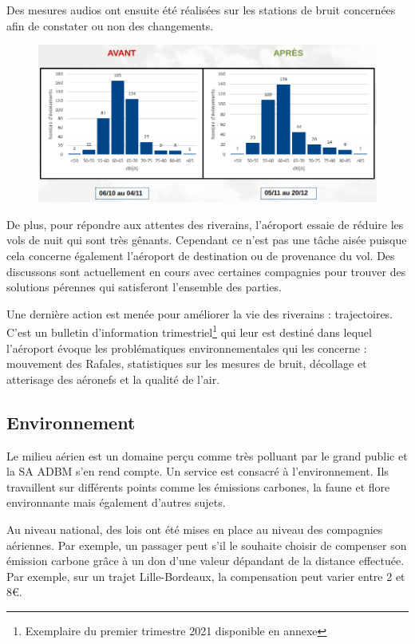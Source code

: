Des mesures audios ont ensuite été réalisées sur les stations de bruit concernées afin de constater ou non des changements.

\begin{figure}[hbt!]
  \centering
  \includegraphics[width=14cm]{Images/bruit_avant_apres.png}\newline
  \label{fig:Mesures audios}
\end{figure}

De plus, pour répondre aux attentes des riverains, l'aéroport essaie de réduire les vols de nuit qui sont très gênants. Cependant ce n'est pas une tâche aisée puisque cela concerne également l'aéroport de destination ou de provenance du vol. Des discussons sont actuellement en cours avec certaines compagnies pour trouver des solutions pérennes qui satisferont l'ensemble des parties.\newline


Une dernière action est menée pour améliorer la vie des riverains : trajectoires. C'est un bulletin d'information trimestriel\footnote{Exemplaire du premier trimestre 2021 disponible en annexe} qui leur est destiné dans lequel l'aéroport évoque les problématiques environnementales qui les concerne : mouvement des Rafales, statistiques sur les mesures de bruit, décollage et atterisage des aéronefs et la qualité de l'air.


\subsection{Environnement}

Le milieu aérien est un domaine perçu comme très polluant par le grand public et la SA ADBM s'en rend compte. Un service est consacré à l'environnement. Ils travaillent sur différents points comme les émissions carbones, la faune et flore environnante mais également d'autres sujets.


Au niveau national, des lois ont été mises en place au niveau des compagnies aériennes. Par exemple, un passager peut s'il le souhaite choisir de compenser son émission carbone grâce à un don d'une valeur dépandant de la distance effectuée. Par exemple, sur un trajet Lille-Bordeaux, la compensation peut varier entre 2 et 8€.

